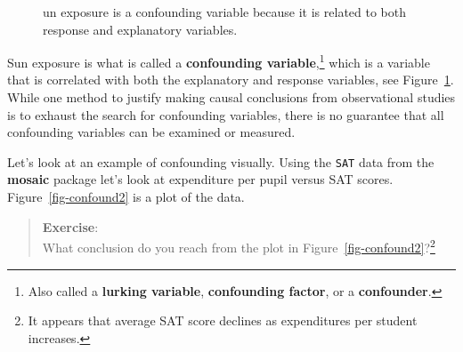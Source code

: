 \documentclass[
  letterpaper,
  DIV=11,
  numbers=noendperiod]{scrreprt}
\begin{document}
\begin{figure}


\caption{\label{fig-confound}un exposure is a confounding variable
because it is related to both response and explanatory variables.}

\end{figure}%

Sun exposure is what is called a \textbf{confounding
variable},\footnote{Also called a \textbf{lurking variable},
  \textbf{confounding factor}, or a \textbf{confounder}.} which is a
variable that is correlated with both the explanatory and response
variables, see Figure~\ref{fig-confound}. While one method to justify
making causal conclusions from observational studies is to exhaust the
search for confounding variables, there is no guarantee that all
confounding variables can be examined or measured.

Let's look at an example of confounding visually. Using the \texttt{SAT}
data from the \textbf{mosaic} package let's look at expenditure per
pupil versus SAT scores. Figure~\ref{fig-confound2} is a plot of the
data.

\begin{quote}
\textbf{Exercise}:\\
What conclusion do you reach from the plot in
Figure~\ref{fig-confound2}?\footnote{It appears that average SAT score
  declines as expenditures per student increases.}
\end{quote}
\end{document}
